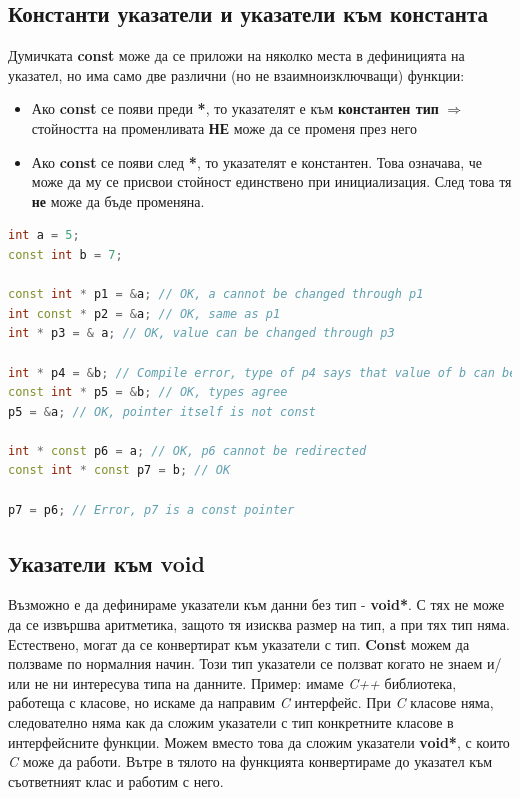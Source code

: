 \documentclass[fleqn,12pt]{article}
\begin{document}
\subsection{Константи указатели и указатели към константа}
Думичката \textbf{const} може да се приложи на няколко места в дефиницията на указател, но има само две различни (но не взаимноизключващи) функции:
\begin{itemize}
    \item Ако \textbf{const} се появи преди \textbf{*}, то указателят е към \textbf{константен тип} $\Rightarrow$ стойността на променливата \textbf{НЕ} може да се променя през него
    \item Ако \textbf{const} се появи след \textbf{*}, то указателят е константен. Това означава, че може да му се присвои стойност единствено при инициализация. След това тя \textbf{не} може да бъде променяна.
\end{itemize}

\begin{lstlisting}[language=C++, caption=Multidimensional pointers 2]
int a = 5;
const int b = 7;

const int * p1 = &a; // OK, a cannot be changed through p1
int const * p2 = &a; // OK, same as p1
int * p3 = & a; // OK, value can be changed through p3

int * p4 = &b; // Compile error, type of p4 says that value of b can be changed through it, but b is const
const int * p5 = &b; // OK, types agree
p5 = &a; // OK, pointer itself is not const

int * const p6 = a; // OK, p6 cannot be redirected
const int * const p7 = b; // OK

p7 = p6; // Error, p7 is a const pointer
\end{lstlisting}

\subsection{Указатели към void}
Възможно е да дефинираме указатели към данни без тип - \textbf{void*}. С тях не може да се извършва аритметика, защото тя изисква размер на тип, 
а при тях тип няма. Естествено, могат да се конвертират към указатели с тип. \textbf{Const} можем да ползваме по нормалния начин.
Този тип указатели се ползват когато не знаем и/или не ни интересува типа на данните. Пример: имаме \textit{C++} библиотека, работеща с класове,
но искаме да направим \textit{C} интерфейс. При \textit{C} класове няма, следователно няма как да сложим указатели с тип конкретните класове
в интерфейсните функции. Можем вместо това да сложим указатели \textbf{void*}, с които \textit{C} може да работи. Вътре в тялото на функцията
конвертираме до указател към съответният клас и работим с него.
\end{document}
